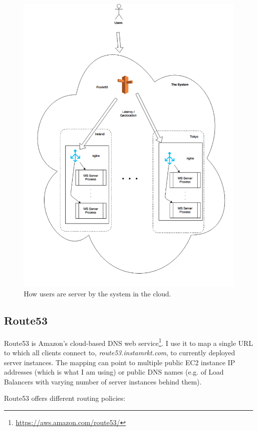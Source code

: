 \documentclass{uvamscse}
\begin{document}
\begin{figure}[H]
\centering
\includegraphics[scale=0.4]{cloudsetup}
\caption{How users are server by the system in the cloud.}
\label{figure:cloudsetup}
\end{figure}

\subsection{Route53}\label{Route53}

Route53 is Amazon's cloud-based DNS web service\footnote{\url{https://aws.amazon.com/route53/}}. I use it to map a single URL to which all clients connect to, \textit{route53.instamrkt.com}, to currently deployed server instances. The mapping can point to multiple public EC2 instance IP addresses (which is what I am using) or public DNS names (e.g. of Load Balancers with varying number of server instances behind them).

Route53 offers different routing policies:
\end{document}
